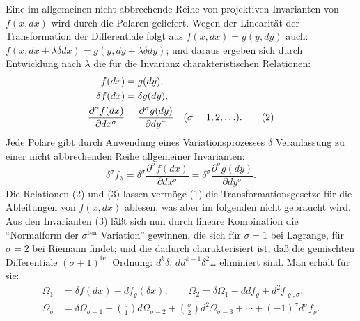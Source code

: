 \documentclass[12pt,a4paper]{article}
\begin{document}
Eine im allgemeinen nicht abbrechende Reihe von projektiven Invarianten von $f(x,dx)$ wird durch die Polaren geliefert. Wegen der Linearit\"at der Transformation der Differentiale folgt aus $f(x,dx)=g(y,dy)$ auch: $f(x,dx+\lambda\delta dx)=g(y,dy+\lambda\delta dy)$; und daraus ergeben sich durch Entwicklung nach $\lambda$ die f\"ur die Invarianz charakteristischen Relationen:
\begin{align}
f(dx)&=g(dy),\notag\\
\delta f(dx)&=\delta g(dy),\notag\\
\frac{\partial^{\sigma}f(dx)}{\partial dx^{\sigma}}&=\frac{\partial^{\sigma}g(dy)}{\partial dy^{\sigma}}\quad(\sigma=1,2,\ldots).\tag{2}
\end{align}
Jede Polare gibt durch Anwendung eines Variationsprozesses $\delta$ Veranlassung zu einer nicht abbrechenden Reihe allgemeiner Invarianten:
\begin{equation}\tag{3}
\delta^{\sigma}f_{\lambda}=\delta^{\sigma}\frac{\partial^{\sigma}f(dx)}{\partial dx^{\sigma}}
=\delta^{\sigma}\frac{\partial^{\sigma}g(dy)}{\partial dy^{\sigma}}.
\end{equation}
Die Relationen (2) und (3) lassen verm\"oge (1) die Transformationsgesetze f\"ur die Ableitungen von $f(x,dx)$ ablesen, was aber im folgenden nicht gebraucht wird. Aus den Invarianten (3) l\"a\ss{}t sich nun durch lineare Kombination die ``Normalform der $\sigma^{\mathrm{ten}}$ Variation'' gewinnen, die sich f\"ur $\sigma=1$ bei Lagrange, f\"ur $\sigma=2$ bei Riemann findet; und die dadurch charakterisiert ist, da\ss{} die gemischten Differentiale $(\sigma+1)^{\mathrm{ter}}$ Ordnung: $d^{k}\delta$, $dd^{k-1}\delta^{2}$\ldots{} eliminiert sind. Man erh\"alt f\"ur sie:
\begin{equation}\tag{4}
\begin{aligned}
\varOmega_{1}&=\delta f(dx)-df_{\varrho}(\delta x),\qquad
\varOmega_{2}=\delta\varOmega_{1}-ddf_{\varrho}+d^{2}f_{\varrho,\sigma},\\
\varOmega_{\sigma}&=\delta\varOmega_{\sigma-1}-\binom{\sigma}{1}d\varOmega_{\sigma-2}
+\binom{\sigma}{2}d^{2}\varOmega_{\sigma-3}+\cdots+(-1)^{\sigma}d^{\sigma}f_{\varrho}.
\end{aligned}
\end{equation}
\end{document}
